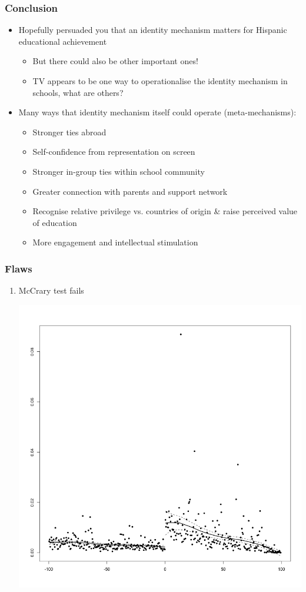 \documentclass{beamer}
\begin{document}
\begin{frame}
\frametitle{Conclusion}
\begin{itemize}
\item Hopefully persuaded you that an identity mechanism matters for Hispanic educational achievement
\begin{itemize}
\item But there could also be other important ones!
\item TV appears to be one way to operationalise the identity mechanism in schools, what are others?
\end{itemize}
\item Many ways that identity mechanism itself could operate (meta-mechanisms): 
\begin{itemize}
\footnotesize
\item Stronger ties abroad
\item Self-confidence from representation on screen
\item Stronger in-group ties within school community
\item Greater connection with parents and support network
\item Recognise relative privilege vs. countries of origin \& raise perceived value of education
\item More engagement and intellectual stimulation 
\end{itemize}

\end{itemize}
\end{frame}



\begin{frame}
\frametitle{Flaws}
\begin{enumerate}
\item McCrary test fails

\includegraphics[width=.6\textwidth]{../../explore/Output/Diagnostics/McCrary.png}\\

%

\end{enumerate}
\end{frame}
\end{document}
